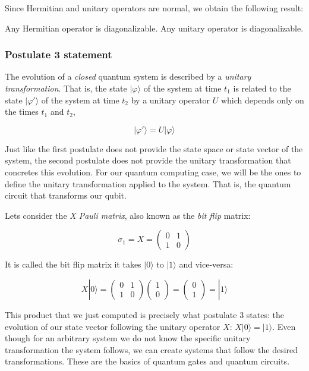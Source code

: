 Since Hermitian and unitary operators are normal, we obtain the following result:

\begin{corollary}
	Any Hermitian operator is diagonalizable. Any unitary operator is diagonalizable.
\end{corollary}

\subsubsection{Postulate 3 statement}


\begin{postulate}
	The evolution of a \emph{closed} quantum system is described by a \emph{unitary transformation}. That is, the state $|\varphi\rangle$ of the system at time $t_1$ is related to the state $|\varphi'\rangle$ of the system at time $t_2$ by a unitary operator $U$ which depends only on the times $t_1$ and $t_2$,
	
	$$ |\varphi'\rangle = U|\varphi\rangle $$
\end{postulate}

Just like the first postulate does not provide the state space or state vector of the system, the second postulate does not provide the unitary transformation that concretes this evolution. For our quantum computing case, we will be the ones to define the unitary transformation applied to the system. That is, the quantum circuit that transforms our qubit.

\begin{exampleth} Lets consider the \emph{X Pauli matrix}, also known as the \emph{bit flip} matrix:
	
	$$ \sigma_1 = X = 
	\begin{pmatrix}
		0 & 1 \\
		1 & 0 
	\end{pmatrix}
	$$
	
	It is called the bit flip matrix it takes $|0\rangle$ to $|1\rangle$ and vice-versa:
	
	$$  X|0\rangle = 
	\begin{pmatrix}
		0 & 1 \\
		1 & 0 
	\end{pmatrix}
	\begin{pmatrix}
		1 \\
		0 
	\end{pmatrix}=
	\begin{pmatrix}
		0 \\
		1 
	\end{pmatrix} =
	|1\rangle
	$$
	
	This product that we just computed is precisely what postulate 3 states: the evolution of our state vector following the unitary operator $X$: $X|0\rangle = |1\rangle$. Even though for an arbitrary system we do not know the specific unitary transformation the system follows, we can create systems that follow the desired transformations. These are the basics of quantum gates and quantum circuits. 
\end{exampleth}

